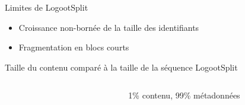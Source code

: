 \begin{frame}{Limites de LogootSplit}
    \begin{itemize}
        \item Croissance non-bornée de la taille des identifiants
        \item Fragmentation en blocs courts
    \end{itemize}
    \begin{block}{Taille du contenu comparé à la taille de la séquence LogootSplit}
        \begin{columns}
            \begin{column}{0.6\textwidth}
                \begin{figure}
                \end{figure}
            \end{column}
            \begin{column}{0.4\textwidth}
                1\% contenu, 99\% métadonnées
            \end{column}
        \end{columns}
    \end{block}
\end{frame}

